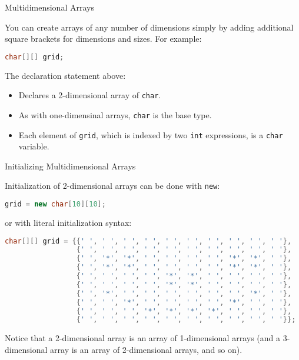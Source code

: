 \documentclass{beamer}
\begin{document}
\begin{frame}[fragile]{Multidimensional Arrays}


You can create arrays of any number of dimensions simply by adding additional square brackets for dimensions and sizes.  For example:

\begin{lstlisting}[language=Java]
char[][] grid;
\end{lstlisting}
The declaration statement above:
\begin{itemize}
\item Declares a 2-dimensional array of  {\tt char}.
\item As with one-dimensinal arrays, {\tt char} is the base type.
\item Each element of {\tt grid}, which is indexed by two {\tt int} expressions, is a {\tt char} variable.
\end{itemize}


\end{frame}

\begin{frame}[fragile]{Initializing Multidimensional Arrays}


Initialization of 2-dimensional arrays can be done with {\tt new}:
\begin{lstlisting}[language=Java]
grid = new char[10][10];
\end{lstlisting}

or with literal initialization syntax:
\begin{lstlisting}[language=Java]
char[][] grid = {{' ', ' ', ' ', ' ', ' ', ' ', ' ', ' ', ' ', ' '},
                 {' ', ' ', ' ', ' ', ' ', ' ', ' ', ' ', ' ', ' '},
                 {' ', '*', '*', ' ', ' ', ' ', ' ', '*', '*', ' '},
                 {' ', '*', '*', ' ', ' ', ' ', ' ', '*', '*', ' '},
                 {' ', ' ', ' ', ' ', '*', '*', ' ', ' ', ' ', ' '},
                 {' ', ' ', ' ', ' ', '*', '*', ' ', ' ', ' ', ' '},
                 {' ', '*', ' ', ' ', ' ', ' ', ' ', ' ', '*', ' '},
                 {' ', ' ', '*', ' ', ' ', ' ', ' ', '*', ' ', ' '},
                 {' ', ' ', ' ', '*', '*', '*', '*', ' ', ' ', ' '},
                 {' ', ' ', ' ', ' ', ' ', ' ', ' ', ' ', ' ', ' '}};
\end{lstlisting}

Notice that a 2-dimensional array is an array of 1-dimensional arrays (and a 3-dimensional array is an array of 2-dimensional arrays, and so on).

\end{frame}
\end{document}
